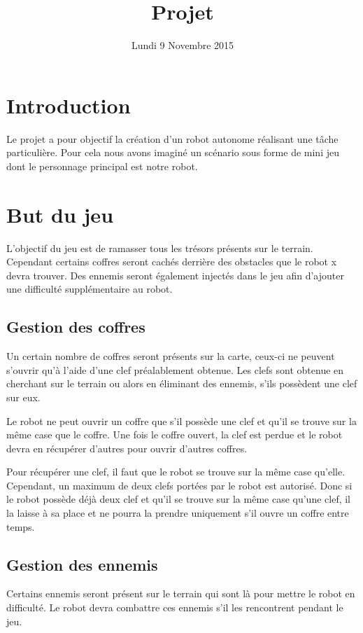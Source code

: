 \documentclass[a4paper 12pts]{article}
\title{Projet}
\date{Lundi 9 Novembre 2015}
\author{}
\begin{document}
\maketitle

\section{Introduction}
Le projet a pour objectif la création d'un robot autonome réalisant une tâche particulière. Pour cela nous avons imaginé un scénario sous forme de mini jeu dont le personnage principal est notre robot.

\section{But du jeu}
L'objectif du jeu est de ramasser tous les trésors présents sur le terrain. Cependant certains coffres seront cachés derrière des obstacles que le robot x devra trouver. Des ennemis seront également injectés dans le jeu afin d'ajouter une difficulté supplémentaire au robot.

\subsection{Gestion des coffres}
Un certain nombre de coffres seront présents sur la carte, ceux-ci ne peuvent s'ouvrir qu'à l'aide d'une clef préalablement obtenue. Les clefs sont obtenue en cherchant sur le terrain ou alors en éliminant des ennemis, s'ils possèdent une clef sur eux.

Le robot ne peut ouvrir un coffre que s'il possède une clef et qu'il se trouve sur la même case que le coffre. Une fois le coffre ouvert, la clef est perdue et le robot devra en récupérer d'autres pour ouvrir d'autres coffres.

Pour récupérer une clef, il faut que le robot se trouve sur la même case qu'elle. Cependant, un maximum de deux clefs portées par le robot est autorisé. Donc si le robot possède déjà deux clef et qu'il se trouve sur la même case qu'une clef, il la laisse à sa place et ne pourra la prendre uniquement s'il ouvre un coffre entre temps.

\subsection{Gestion des ennemis}
Certains ennemis seront présent sur le terrain qui sont là pour mettre le robot en difficulté. Le robot devra combattre ces ennemis s'il les rencontrent pendant le jeu.
\end{document}
